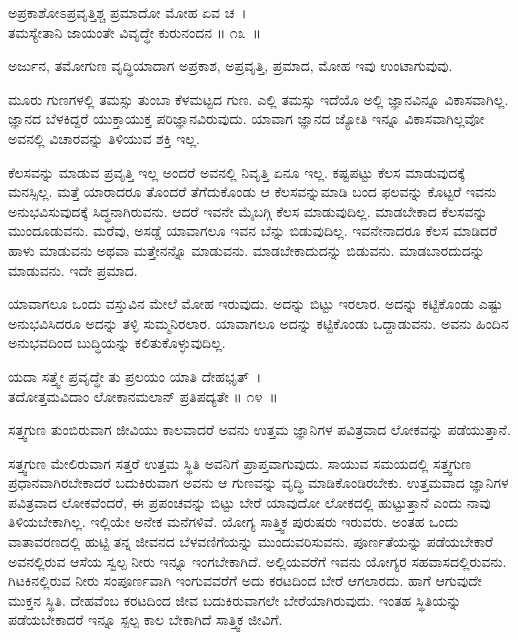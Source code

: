 \begin{shloka}
ಅಪ್ರಕಾಶೋಽಪ್ರವೃತ್ತಿಶ್ಚ ಪ್ರಮಾದೋ ಮೋಹ ಏವ ಚ~।\\ತಮಸ್ಯೇತಾನಿ ಜಾಯಂತೇ ವಿವೃದ್ಧೇ ಕುರುನಂದನ \hfill॥ ೧೩~॥
\end{shloka}

\begin{artha}
ಅರ್ಜುನ, ತಮೋಗುಣ ವೃದ್ಧಿಯಾದಾಗ ಅಪ್ರಕಾಶ, ಅಪ್ರವೃತ್ತಿ, ಪ್ರಮಾದ, ಮೋಹ ಇವು ಉಂಟಾಗುವುವು.
\end{artha}

ಮೂರು ಗುಣಗಳಲ್ಲಿ ತಮಸ್ಸು ತುಂಬಾ ಕೆಳಮಟ್ಟದ ಗುಣ. ಎಲ್ಲಿ ತಮಸ್ಸು ಇದೆಯೊ ಅಲ್ಲಿ ಜ್ಞಾನವಿನ್ನೂ ವಿಕಾಸವಾಗಿಲ್ಲ. ಜ್ಞಾನದ ಬೆಳಕಿದ್ದರೆ ಯುಕ್ತಾಯುಕ್ತ ಪರಿಜ್ಞಾನವಿರುವುದು. ಯಾವಾಗ ಜ್ಞಾನದ ಜ್ಯೋತಿ ಇನ್ನೂ ವಿಕಾಸವಾಗಿಲ್ಲವೋ ಅವನಲ್ಲಿ ವಿಚಾರವನ್ನು ತಿಳಿಯುವ ಶಕ್ತಿ ಇಲ್ಲ.

ಕೆಲಸವನ್ನು ಮಾಡುವ ಪ್ರವೃತ್ತಿ ಇಲ್ಲ ಅಂದರೆ ಅವನಲ್ಲಿ ನಿವೃತ್ತಿ ಏನೂ ಇಲ್ಲ. ಕಷ್ಟಪಟ್ಟು ಕೆಲಸ ಮಾಡುವುದಕ್ಕೆ ಮನಸ್ಸಿಲ್ಲ. ಮತ್ತೆ ಯಾರಾದರೂ ತೊಂದರೆ ತೆಗೆದುಕೊಂಡು ಆ ಕೆಲಸವನ್ನು\break ಮಾಡಿ ಬಂದ ಫಲವನ್ನು ಕೊಟ್ಟರೆ ಇವನು ಅನುಭವಿಸುವುದಕ್ಕೆ ಸಿದ್ಧನಾಗಿರುವನು. ಆದರೆ ಇವನೇ ಮೈಬಗ್ಗಿ ಕೆಲಸ ಮಾಡುವುದಿಲ್ಲ. ಮಾಡಬೇಕಾದ ಕೆಲಸವನ್ನು ಮುಂದೂಡುವನು. ಮರೆವು, ಅಸಡ್ಡೆ ಯಾವಾಗಲೂ ಇವನ ಬೆನ್ನು ಬಿಡುವುದಿಲ್ಲ. ಇವನೇನಾದರೂ ಕೆಲಸ ಮಾಡಿದರೆ ಹಾಳು ಮಾಡುವನು ಅಥವಾ ಮತ್ತೇನನ್ನೊ ಮಾಡುವನು. ಮಾಡಬೇಕಾದುದನ್ನು ಬಿಡುವನು. ಮಾಡಬಾರದುದನ್ನು ಮಾಡುವನು. ಇದೇ ಪ್ರಮಾದ.

ಯಾವಾಗಲೂ ಒಂದು ವಸ್ತುವಿನ ಮೇಲೆ ಮೋಹ ಇರುವುದು. ಅದನ್ನು ಬಿಟ್ಟು ಇರಲಾರ. ಅದನ್ನು ಕಟ್ಟಿಕೊಂಡು ಎಷ್ಟು ಅನುಭವಿಸಿದರೂ ಅದನ್ನು ತಳ್ಳಿ ಸುಮ್ಮನಿರಲಾರ. ಯಾವಾಗಲೂ ಅದನ್ನು ಕಟ್ಟಿಕೊಂಡು ಒದ್ದಾಡುವನು. ಅವನು ಹಿಂದಿನ ಅನುಭವದಿಂದ ಬುದ್ಧಿಯನ್ನು ಕಲಿತು\-ಕೊಳ್ಳುವುದಿಲ್ಲ.

\begin{shloka}
ಯದಾ ಸತ್ತ್ವೇ ಪ್ರವೃದ್ಧೇ ತು ಪ್ರಲಯಂ ಯಾತಿ ದೇಹಭೃತ್~।\\ತದೋತ್ತಮವಿದಾಂ ಲೋಕಾನಮಲಾನ್ ಪ್ರತಿಪದ್ಯತೇ \hfill॥ ೧೪~॥
\end{shloka}

\begin{artha}
ಸತ್ತ್ವಗುಣ ತುಂಬಿರುವಾಗ ಜೀವಿಯು ಕಾಲವಾದರೆ ಅವನು ಉತ್ತಮ ಜ್ಞಾನಿಗಳ ಪವಿತ್ರವಾದ ಲೋಕವನ್ನು ಪಡೆಯುತ್ತಾನೆ.
\end{artha}

ಸತ್ತ್ವಗುಣ ಮೇಲಿರುವಾಗ ಸತ್ತರೆ ಉತ್ತಮ ಸ್ಥಿತಿ ಅವನಿಗೆ ಪ್ರಾಪ್ತವಾಗುವುದು. ಸಾಯುವ ಸಮಯದಲ್ಲಿ ಸತ್ತ್ವಗುಣ ಪ್ರಧಾನವಾಗಿರಬೇಕಾದರೆ ಬದುಕಿರುವಾಗ ಅವನು ಆ ಗುಣವನ್ನು ವೃದ್ಧಿ ಮಾಡಿಕೊಂಡಿರಬೇಕು. ಉತ್ತಮವಾದ ಜ್ಞಾನಿಗಳ ಪವಿತ್ರವಾದ ಲೋಕವೆಂದರೆ, ಈ ಪ್ರಪಂಚವನ್ನು ಬಿಟ್ಟು ಬೇರೆ ಯಾವುದೋ ಲೋಕದಲ್ಲಿ ಹುಟ್ಟುತ್ತಾನೆ ಎಂದು ನಾವು ತಿಳಿಯಬೇಕಾಗಿಲ್ಲ. ಇಲ್ಲಿಯೇ ಅನೇಕ ಮನೆಗಳಿವೆ. ಯೋಗ್ಯ ಸಾತ್ತ್ವಿಕ ಪುರುಷರು ಇರುವರು. ಅಂತಹ ಒಂದು ವಾತಾವರಣದಲ್ಲಿ ಹುಟ್ಟಿ ತನ್ನ ಜೀವನದ ಬೆಳವಣಿಗೆಯನ್ನು ಮುಂದುವರಿಸುವನು. ಪೂರ್ಣತೆಯನ್ನು ಪಡೆಯಬೇಕಾರೆ ಅವನಲ್ಲಿರುವ ಆಸೆಯ ಸ್ವಲ್ಪ ನೀರು ಇನ್ನೂ ಇಂಗಬೇಕಾಗಿದೆ. ಅಲ್ಲಿಯವರೆಗೆ ಇವನು ಯೋಗ್ಯರ ಸಹವಾಸದಲ್ಲಿರುವನು. ಗಿಟಕಿನಲ್ಲಿರುವ ನೀರು ಸಂಪೂರ್ಣವಾಗಿ ಇಂಗುವವರೆಗೆ ಅದು ಕರಟದಿಂದ ಬೇರೆ ಆಗಲಾರದು. ಹಾಗೆ ಆಗುವುದೇ ಮುಕ್ತನ ಸ್ಥಿತಿ. ದೇಹವೆಂಬ ಕರಟದಿಂದ ಜೀವ ಬದುಕಿರುವಾಗಲೇ ಬೇರೆಯಾಗಿರುವುದು. ಇಂತಹ ಸ್ಥಿತಿಯನ್ನು ಪಡೆಯಬೇಕಾದರೆ ಇನ್ನೂ ಸ್ಪಲ್ಪ ಕಾಲ ಬೇಕಾಗಿದೆ ಸಾತ್ತ್ವಿಕ ಜೀವಿಗೆ.

